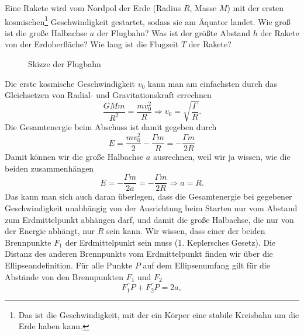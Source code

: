 \begin{Exercise}[title = Ballistische Rakete, origin = J. Kaalda, difficulty =3, label = cmellipse]
	Eine Rakete wird vom Nordpol der Erde (Radius $R$, Masse $M$) mit der ersten kosmischen\footnote[2]{Das ist die Geschwindigkeit, mit der ein Körper eine stabile Kreisbahn um die Erde haben kann.} Geschwindigkeit gestartet, sodass sie am Äquator landet. 
	\Question Wie groß ist die große Halbachse $a$ der Flugbahn?
	\Question Was ist der größte Abstand $h$ der Rakete von der Erdoberfläche?
	\Question Wie lang ist die Flugzeit $T$ der Rakete?
\end{Exercise}
\begin{Answer}[ref = cmellipse]
	\begin{figure}[h]
		\centering
		
		\caption{Skizze der Flugbahn}
		\label{fig:cmellsk}
	\end{figure}
	\Question Die erste kosmische Geschwindigkeit $v_0$ kann man am einfachsten durch das Gleichsetzen von  Radial- und Gravitationskraft errechnen
	\begin{equation*}\label{cmellipse:vo}
		\frac{GMm}{R^2} = \frac{mv_0^2}{R} \Rightarrow v_0 = \sqrt{\frac{\Gamma}{R}}.
	\end{equation*}
	Die Gesamtenergie beim Abschuss ist damit gegeben durch
	\begin{equation*}
		E = \frac{mv_0^2}{2} - \frac{\Gamma m}{R} = -\frac{\Gamma m}{2R}
	\end{equation*}
	Damit können wir die große Halbachse $a$ ausrechnen, weil wir ja wissen, wie die beiden zusammenhängen
	\begin{equation}\label{cmellipse:sma}
	\boxed{
		E = -\frac{\Gamma m}{2a} = -\frac{\Gamma m}{2R} \Rightarrow a = R.}
	\end{equation}
	Das kann man sich auch daran überlegen, dass die Gesamtenergie bei gegebener Geschwindigkeit unabhängig von der Ausrichtung beim Starten nur vom Abstand zum Erdmittelpunkt abhängen darf, und damit die große Halbachse, die nur von der Energie abhängt, nur $R$ sein kann.
	\Question Wir wissen, dass einer der beiden Brennpunkte $F_1$ der Erdmittelpunkt sein muss (1. Keplersches Gesetz). Die Distanz des anderen Brennpunkts vom Erdmittelpunkt finden wir über die Ellipseandefinition. Für alle Punkte $P$ auf dem Ellipsenumfang gilt für die Abstände von den Brennpunkten $F_1$ und $F_2$
	\begin{equation}\label{cmellipse:edef}
	\overline{F_1P} + \overline{F_2P} = 2a,
	\end{equation}

\end{Answer}
